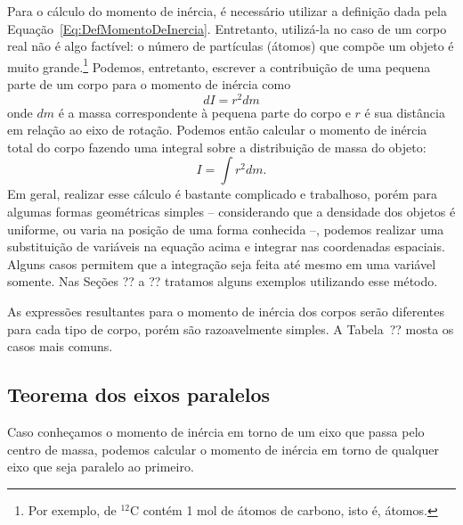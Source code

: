 Para o cálculo do momento de inércia, é necessário utilizar a definição dada pela Equação~\ref{Eq:DefMomentoDeInercia}. Entretanto, utilizá-la no caso de um corpo real não é algo factível: o número de partículas (átomos) que compõe um objeto é muito grande.\footnote{Por exemplo,  de $^12\textrm{C}$ contém 1 mol de átomos de carbono, isto é,  átomos.} Podemos, entretanto, escrever a contribuição de uma pequena parte de um corpo para o momento de inércia como
\begin{equation}
	dI = r^2 dm
\end{equation}
onde $dm$ é a massa correspondente à pequena parte do corpo e $r$ é sua distância em relação ao eixo de rotação. Podemos então calcular o momento de inércia total do corpo fazendo uma integral sobre a distribuição de massa do objeto:
\begin{equation}\label{Eq:MomInerciaIntegral}
	I = \int r^2 dm.
\end{equation}
%
Em geral, realizar esse cálculo é bastante complicado e trabalhoso, porém para algumas formas geométricas simples -- considerando que a densidade dos objetos é uniforme, ou varia na posição de uma forma conhecida --, podemos realizar uma substituição de variáveis na equação acima e integrar nas coordenadas espaciais. Alguns casos permitem que a integração seja feita até mesmo em uma variável somente. Nas Seções ?? a ?? tratamos alguns exemplos utilizando esse método.

As expressões resultantes para o momento de inércia dos corpos serão diferentes para cada tipo de corpo, porém são razoavelmente simples. A Tabela~?? mosta os casos mais comuns.

\subsection{Teorema dos eixos paralelos}

Caso conheçamos o momento de inércia em torno de um eixo que passa pelo centro de massa, podemos calcular o momento de inércia em torno de qualquer eixo que seja paralelo ao primeiro.


